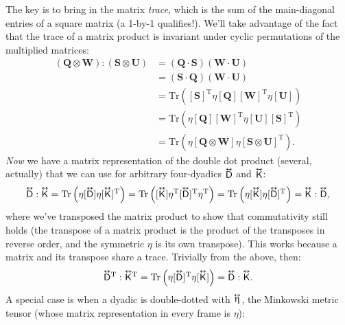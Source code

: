 \documentclass[12pt]{article}
\renewcommand{\vv}[1]{\mathbf{#1}}
\newcommand{\tightoverset}[2]{%
  \mathop{#2}\limits^{\vbox to -.5ex{\kern-0.75ex\hbox{$#1$}\vss}}}
\newcommand{\inlinedy}[1]{\tightoverset{\text{\tiny$\bm\leftrightarrow$}}{#1}}
\newcommand{\capdy}[1]{ \overset{ \text{\tiny$\bm\leftrightarrow$} }{\vphantom{\text{\small{A}}}\smash{#1}} }
\begin{document}
The key is to bring in the matrix \emph{trace}, which is the sum of the main-diagonal entries of a square matrix (a 1-by-1 qualifies!). We'll take advantage of the fact that the trace of a matrix product is invariant under cyclic permutations of the multiplied matrices:
\begin{equation*}
\begin{aligned}
(\vv Q \otimes \vv W) : (\vv S \otimes \vv U) &= (\vv Q \cdot \vv S) (\vv W \cdot \vv U) \\
&= (\vv S \cdot \vv Q) (\vv W \cdot \vv U) \\
&= \mathrm{Tr} \left( [\vv S]^{\mathrm{T}} \eta [\vv Q] [\vv W]^{\mathrm{T}} \eta [\vv U] \right) \\[2pt]
&= \mathrm{Tr} \left( \eta [\vv Q] [\vv W]^{\mathrm{T}} \eta [\vv U] [\vv S]^{\mathrm{T}} \right) \\[2pt]
&= \mathrm{Tr} \left( \eta [\vv Q \otimes \vv W] \eta [\vv S \otimes \vv U]^\mathrm{T} \right).
\end{aligned}
\end{equation*}
\emph{Now} we have a matrix representation of the double dot product (several, actually) that we can use for arbitrary four-dyadics $\inlinedy{\mathsf{D}}$ and $\inlinedy{\mathsf{K}}$:
\begin{equation*}
\capdy{\mathsf{D}} : \capdy{\mathsf{K}} = \mathrm{Tr} \left( \eta [\capdy{\mathsf{D}}] \eta [ \capdy{\mathsf{K}} ]^{\mathrm{T}} \right) = \mathrm{Tr} \left( [\capdy{\mathsf{K}}] \eta^{\mathrm{T}} [ \capdy{\mathsf{D}} ]^{\mathrm{T}} \eta^{\mathrm{T}} \right) = \mathrm{Tr} \left( \eta [\capdy{\mathsf{K}}] \eta [ \capdy{\mathsf{D}} ]^{\mathrm{T}} \right) = \capdy{\mathsf{K}} : \capdy{\mathsf{D}} ,
\end{equation*}
where we've transposed the matrix product to show that commutativity still holds (the transpose of a matrix product is the product of the transposes in reverse order, and the symmetric $\eta$ is its own transpose). This works because a matrix and its transpose share a trace. Trivially from the above, then:
\begin{equation*}
\capdy{\mathsf{D}} \mkern0mu ^\mathrm{T} : \capdy{\mathsf{K}} \mkern0mu ^\mathrm{T} = \mathrm{Tr} \left( \eta [\capdy{\mathsf{D}}]^{\mathrm{T}} \eta [ \capdy{\mathsf{K}} ] \right) = \capdy{\mathsf{D}} : \capdy{\mathsf{K}} .
\end{equation*}
A special case is when a dyadic is double-dotted with $\inlinedy{\upeta}$, the Minkowski metric tensor (whose matrix representation in every frame is $\eta$):
\end{document}
